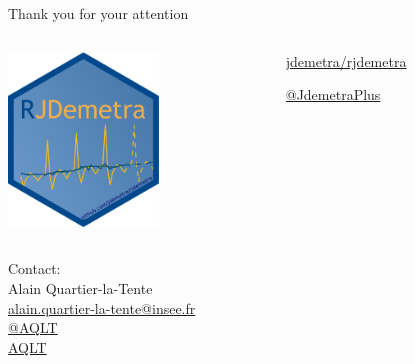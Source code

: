 \documentclass[10pt,xcolor=table,color={dvipsnames,usenames},ignorenonframetext,usepdftitle=false,french]{beamer}
\begin{document}
\begin{frame}{Thank you for your attention}
\protect\hypertarget{thank-you-for-your-attention}{}

\vspace{-0.2cm}

\begin{columns}
\begin{column}{0.4\textwidth}
\begin{center}
\includegraphics[width=4cm]{img/rjdemetra_logo.png}
\end{center}
\end{column}
\begin{column}{0.5\textwidth} 
\href{https://github.com/jdemetra/rjdemetra}{\faGithub{} jdemetra/rjdemetra}  

\href{https://twitter.com/JDemetraPlus}{\faTwitter{} @JdemetraPlus}
\end{column}
\end{columns}

\vfill

Contact:\\
Alain Quartier-la-Tente\\
\href{mailto:alain.quartier-la-tente@insee.fr}{\faEnvelope{} alain.quartier-la-tente@insee.fr}\\
\href{https://twitter.com/AQLT}{\faTwitter{} @AQLT}\\
\href{https://github.com/AQLT}{\faGithub{} AQLT}

\end{frame}
\end{document}
